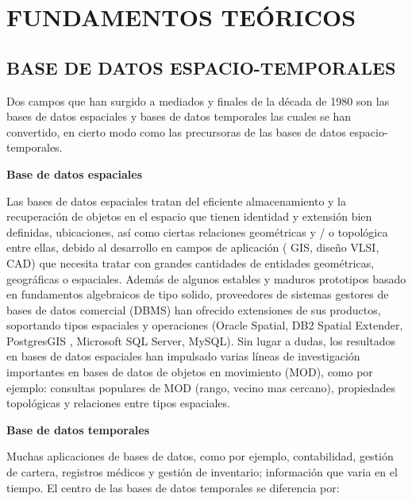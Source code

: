 \chapter{FUNDAMENTOS TEÓRICOS}


\section{BASE DE DATOS ESPACIO-TEMPORALES}

Dos campos que han surgido a mediados y finales de la década de 1980 son las  bases de datos espaciales y bases de
datos temporales las cuales se han convertido, en cierto modo como  las precursoras de las bases de datos
espacio-temporales.


\textbf{Base de datos espaciales} 

Las bases de datos espaciales tratan del eficiente almacenamiento y la recuperación de objetos en
el espacio que tienen identidad y extensión bien definidas, ubicaciones, así como ciertas relaciones geométricas
y / o topológica entre ellas, debido al desarrollo en campos de aplicación ( GIS, diseño VLSI, CAD) que necesita
tratar  con  grandes cantidades de entidades geométricas, geográficas o espaciales. Además de algunos estables y 
maduros prototipos basado en fundamentos algebraicos de tipo solido,   proveedores de sistemas gestores de bases de
datos comercial (DBMS) han ofrecido extensiones de sus productos, soportando tipos espaciales y operaciones
(Oracle Spatial, DB2 Spatial Extender, PostgresGIS , Microsoft SQL Server, MySQL). Sin lugar a dudas, los 
resultados en bases de datos espaciales han impulsado varias líneas de investigación importantes en bases
de datos de objetos en movimiento (MOD), como por ejemplo: consultas  populares de MOD (rango, 
vecino mas cercano),  propiedades topológicas y relaciones entre tipos espaciales. \cite{yuzheng2011}


\textbf{Base de datos temporales}


Muchas aplicaciones de bases de datos, como por ejemplo, contabilidad, gestión de cartera, registros médicos
y gestión de inventario; información que varia en el tiempo. El centro de las bases de datos temporales se
diferencia por:

